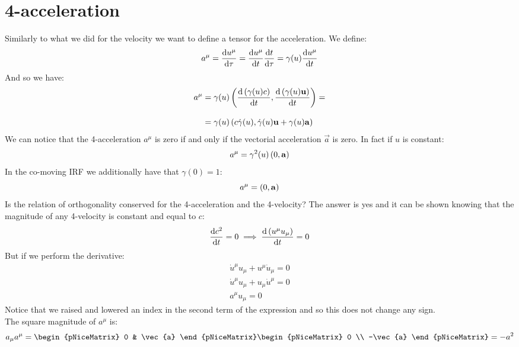 \section{4-acceleration}
Similarly to what we did for the velocity we want to define a tensor for the acceleration. We define:
\begin{equation}
  a^{\mu} = \dv{u^{\mu}}{\tau} = \dv{u^{\mu}}{t}\dv{t}{\tau} = \gamma(u)\dv{u^{\mu}}{t}
\end{equation}
And so we have:
\begin{equation}
  \begin{split}
    a^{\mu} &= \gamma(u)\brackets{\dv{\brackets{\gamma(u)c}}{t}, \dv{\brackets{\gamma(u)\vec{u}}}{t}} = \\[8pt]
    &= \gamma(u)\brackets{c\dot{\gamma}(u), \dot{\gamma}(u)\vec{u} + \gamma(u)\vec{a}}
  \end{split}
\end{equation}
We can notice that the 4-acceleration $a^{\mu}$ is zero if and only if the vectorial acceleration $\vec{a}$ is zero. In fact if $u$ is constant:
\begin{equation}
  a^{\mu} = \gamma^2(u)\left(0,\vb{a}\right)
\end{equation}
In the co-moving IRF we additionally have that $\gamma(0) = 1$:
\begin{equation}
  a^{\mu} = \left(0,\vb{a}\right)
\end{equation}
Is the relation of orthogonality conserved for the 4-acceleration and the 4-velocity? The answer is yes and it can be shown knowing that the magnitude of any 4-velocity is constant and equal to $c$:
\begin{equation}
  \dv{c^2}{t} = 0 \implies \dv{\brackets{u^{\mu}u_{\mu}}}{t} = 0
\end{equation}
But if we perform the derivative:
\begin{equation}
  \begin{split}
    \dot{u}^{\mu}u_{\mu} + u^{\mu}\dot{u}_{\mu} = 0 \\[8pt]
    \dot{u}^{\mu}u_{\mu} + u_{\mu}\dot{u}^{\mu} = 0 \\[8pt]
    \boxed{a^{\mu}u_{\mu} = 0}
  \end{split}
\end{equation}
Notice that we raised and lowered an index in the second term of the expression and so this does not change any sign.\\
The square magnitude of $a^{\mu}$ is:
\begin{equation}
  a_{\mu}a^{\mu} = \begin{pNiceMatrix}
    0 & \vec{a}
  \end{pNiceMatrix}
  \begin{pNiceMatrix}
    0 \\ -\vec{a}
  \end{pNiceMatrix} = -a^2
\end{equation}
